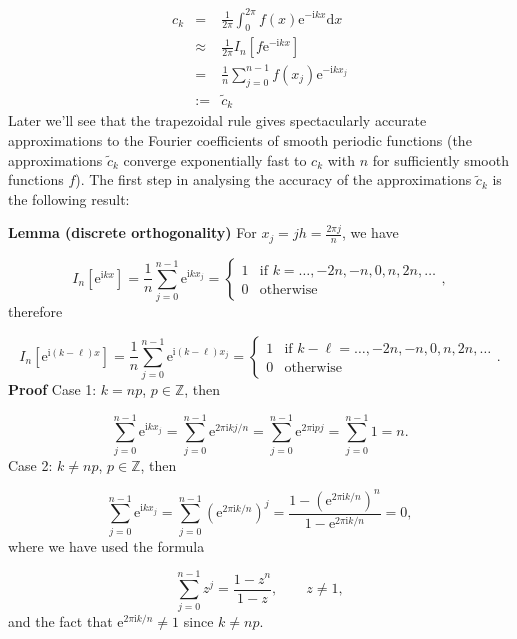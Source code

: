 \documentclass[12pt,landscape]{article}
\begin{document}
{\begin{eqnarray*}
c_k &=& \frac{1}{2\pi}\int_{0}^{2\pi} f(x) \mathrm{e}^{-\mathrm{i}k x} \mathrm{d} x \\
    &\approx & \frac{1}{2\pi}I_{n}\left[f\mathrm{e}^{-\mathrm{i}k x}\right]  \\
    &=& \frac{1}{n}\sum_{j = 0}^{n-1} f(x_j)\mathrm{e}^{-\mathrm{i}kx_j} \\
    &:=& \widetilde{c}_k
\end{eqnarray*}
Later we'll see that the trapezoidal rule gives spectacularly accurate approximations to the Fourier coefficients of smooth periodic functions (the approximations $\widetilde{c}_k$ converge exponentially fast to $c_k$ with $n$ for sufficiently smooth functions $f$).  The first step in analysing the accuracy of the approximations $\widetilde{c}_k$ is the following result:

\textbf{Lemma (discrete orthogonality)} For $x_j = jh = \frac{2\pi j}{n}$, we have

\[
I_n\left[\mathrm{e}^{\mathrm{i}kx}\right] = \frac{1}{n}\sum_{j = 0}^{n-1} \mathrm{e}^{\mathrm{i}kx_j} = \begin{cases}
1 & \text{if } k = \ldots, -2n, -n, 0, n, 2n, \ldots \\
0 & \text{otherwise}
\end{cases},
\]
therefore

\[
I_n\left[\mathrm{e}^{\mathrm{i}(k-\ell)x}\right] = \frac{1}{n}\sum_{j = 0}^{n-1} \mathrm{e}^{\mathrm{i}(k-\ell)x_j} = \begin{cases}
1 & \text{if } k-\ell = \ldots, -2n, -n, 0, n, 2n, \ldots \\
0 & \text{otherwise}
\end{cases}.
\]
\textbf{Proof} Case 1: $k = np$, $p \in \mathbb{Z}$, then

\[
\sum_{j = 0}^{n-1} \mathrm{e}^{\mathrm{i}kx_j} = \sum_{j = 0}^{n-1} \mathrm{e}^{2\pi\mathrm{i}kj/n} = \sum_{j = 0}^{n-1} \mathrm{e}^{2\pi\mathrm{i}pj} = \sum_{j = 0}^{n-1} 1 = n.
\]
Case 2: $k \neq np$, $p \in \mathbb{Z}$, then

\[
\sum_{j = 0}^{n-1} \mathrm{e}^{\mathrm{i}kx_j} = \sum_{j = 0}^{n-1} \left(\mathrm{e}^{2\pi\mathrm{i}k/n}\right)^{j} = \frac{1-\left(\mathrm{e}^{2\pi\mathrm{i}k/n}\right)^{n}}{1-\mathrm{e}^{2\pi\mathrm{i}k/n}} = 0,
\]
where we have used the formula

\[
\sum_{j = 0}^{n-1} z^{j} = \frac{1-z^n}{1-z},\qquad z \neq 1,
\]
and the fact that $\mathrm{e}^{2\pi\mathrm{i}k/n} \neq 1$ since $k \neq np$.

}
\end{document}
